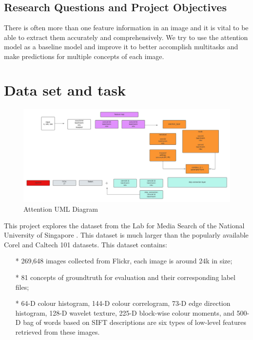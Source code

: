 \documentclass{article}
\begin{document}
\subsection{Research Questions and Project Objectives}
There is often more than one feature information in an image and it is vital to be able to extract them accurately and comprehensively. We try to use the attention model as a baseline model and improve it to better accomplish multitasks and make predictions for multiple concepts of each image.


\section{Data set and task} 

\begin{figure} [htp]
    \centering
    \includegraphics[width=1\textwidth]{attention_uml_v1.jpeg}
    \caption{Attention UML Diagram}
    \label{fig:attention UML diagram}
\end{figure}

This project explores the dataset from the Lab for Media Search of the National University of Singapore \cite{nus-url}. This dataset is much larger than the popularly available Corel \cite{corel-url} and Caltech 101 \cite{caltech-url} datasets. This dataset contains:
\begin{itemize}
\item[*] 269,648 images collected from Flickr, each image is around 24k in size;
\item[*] 81 concepts of groundtruth for evaluation and their corresponding label files;
\item[*] 64-D colour histogram, 144-D colour correlogram, 73-D edge direction histogram, 128-D wavelet texture, 225-D block-wise colour moments, and 500-D bag of words based on SIFT descriptions are six types of low-level features retrieved from these images.
\end{itemize}
\end{document}
